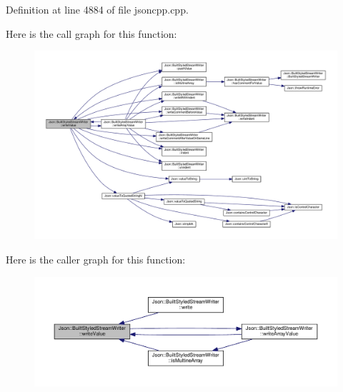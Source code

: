 Definition at line 4884 of file jsoncpp.\+cpp.



Here is the call graph for this function\+:\nopagebreak
\begin{figure}[H]
\begin{center}
\leavevmode
\includegraphics[width=350pt]{struct_json_1_1_built_styled_stream_writer_a7c9da861861e570a51b45f270c9ff150_cgraph}
\end{center}
\end{figure}




Here is the caller graph for this function\+:\nopagebreak
\begin{figure}[H]
\begin{center}
\leavevmode
\includegraphics[width=350pt]{struct_json_1_1_built_styled_stream_writer_a7c9da861861e570a51b45f270c9ff150_icgraph}
\end{center}
\end{figure}


